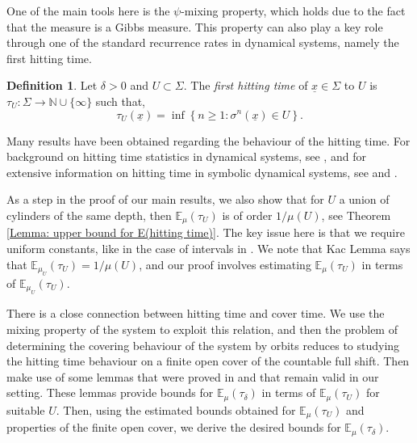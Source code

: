 \documentclass[11pt, reqno]{amsart}
\theoremstyle{plain}%
\theoremstyle{definition}
\newtheorem{definition}[theorem]{Definition}
\theoremstyle{definition}
\def\N{\ensuremath{\mathbb N}}
\def\E{\mathbb E}
\def\ulx{\underline{x}}
\numberwithin{equation}{section}
\begin{document}
One of the main tools here is the $\psi$-mixing property, which holds due to the fact that the measure is a Gibbs measure. This property can also play a key role through one of the standard recurrence rates in dynamical systems, namely the first hitting time.
\begin{definition}\label{Def: hitting time}
    Let $\delta>0$ and $U\subset \Sigma$. The \textit{first hitting time} of $\ulx\in \Sigma$ to $U$ is $\tau_U:\Sigma\to\N\cup\{\infty\}$ such that,
    $$\tau_U(\ulx)=\inf\left\{n\ge1 : \sigma^n(\ulx)\in U\right\}.$$
\end{definition}
Many results have been obtained regarding the behaviour of the hitting time. For background on hitting time statistics in dynamical systems, see \cite[Chapter 5]{Mike's book}, and for extensive information on hitting time in symbolic dynamical systems, see \cite{Coelho} and \cite{GalSch}. 

As a step in the proof of our main results, we also show that for $U$ a union of cylinders of the same depth, then $\E_\mu(\tau_U)$ is of order $1/\mu(U)$, see Theorem \ref{Lemma: upper bound for E(hitting time)}. The key issue here is that we require uniform constants, like in the case of intervals in \cite[Theorem 4.1]{MikeNatali}. We note that Kac Lemma says that $\E_{\mu_U}(\tau_U)=1/\mu(U)$, and our proof involves estimating $\E_\mu(\tau_U)$ in terms of $\E_{\mu_U}(\tau_U)$.

There is a close connection between hitting time and cover time. We use the mixing property of the system to exploit this relation, and then the problem of determining the covering behaviour of the system by orbits reduces to studying the hitting time behaviour on a finite open cover of the countable full shift. Then make use of some lemmas that were proved in \cite{MikeNatali} and that remain valid in our setting. These lemmas provide bounds for $\E_{\mu} (\tau_\delta)$ in terms of $\E_{\mu} (\tau_U)$ for suitable $U$. Then, using the estimated bounds obtained for $\E_{\mu} (\tau_U)$ and properties of the finite open cover, we derive the desired bounds for $\E_{\mu} (\tau_\delta)$.
\end{document}
